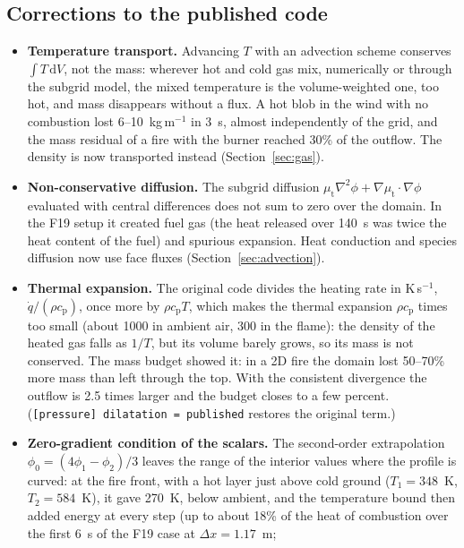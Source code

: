\documentclass[11pt,a4paper]{article}
\newcommand{\dd}{\,\mathrm{d}}
\newcommand{\code}[1]{\texttt{#1}}
\begin{document}
\subsection{Corrections to the published code}\label{app:corrections}
\begin{itemize}
  \item \textbf{Temperature transport.} Advancing $T$ with an advection scheme conserves $\int T\dd V$,
        not the mass: wherever hot and cold gas mix, numerically or through the subgrid model, the
        mixed temperature is the volume-weighted one, too hot, and mass disappears without a flux. A
        hot blob in the wind with no combustion lost 6--10~kg\,m$^{-1}$ in 3~s, almost independently of
        the grid, and the mass residual of a fire with the burner reached 30\% of the outflow. The
        density is now transported instead (Section~\ref{sec:gas}).
  \item \textbf{Non-conservative diffusion.} The subgrid diffusion
        $\mu_\text{t}\nabla^2\phi+\nabla\mu_\text{t}\cdot\nabla\phi$ evaluated with central differences does not sum to
        zero over the domain. In the F19 setup it created fuel gas (the heat released over 140~s was
        twice the heat content of the fuel) and spurious expansion. Heat conduction and species
        diffusion now use face fluxes (Section~\ref{sec:advection}).
  \item \textbf{Thermal expansion.} The original code divides the heating rate in K\,s$^{-1}$,
        $\dot q/(\rho c_\text{p})$, once more by $\rho c_\text{p} T$, which makes the thermal expansion $\rho c_\text{p}$
        times too small (about 1000 in ambient air, 300 in the flame): the density of the heated gas
        falls as $1/T$, but its volume barely grows, so its mass is not conserved. The mass budget
        showed it: in a 2D fire the domain lost 50--70\% more mass than left through the top. With the
        consistent divergence the outflow is 2.5 times larger and the budget closes to a few percent.
        (\code{[pressure] dilatation = published} restores the original term.)
  \item \textbf{Zero-gradient condition of the scalars.} The second-order extrapolation
        $\phi_0=(4\phi_1-\phi_2)/3$ leaves the range of the interior values where the profile is
        curved: at the fire front, with a hot layer just above cold ground ($T_1=348$~K, $T_2=584$~K),
        it gave 270~K, below ambient, and the temperature bound then added energy at every step (up to
        about 18\% of the heat of combustion over the first 6~s of the F19 case at $\Delta x=1.17$~m;

\end{itemize}
\end{document}
